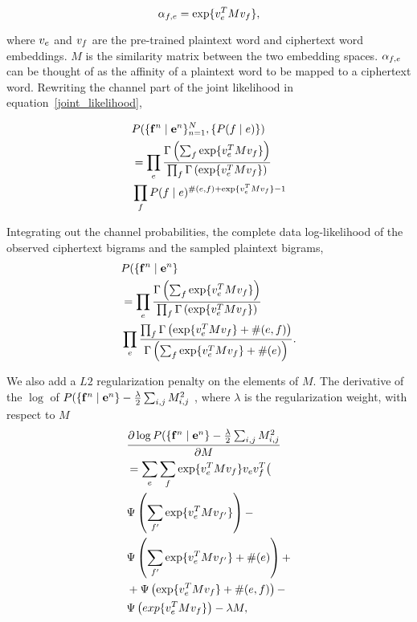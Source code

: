 \begin{equation}
\alpha_{f,e} = \exp \{ v_{e}^T  M  v_{f} \},
\end{equation}

where $v_{e}$ and $v_{f}$ are the pre-trained plaintext word and ciphertext word embeddings.  $M$ is the similarity matrix between the two embedding spaces. $\alpha_{f,e}$ can be thought of as the affinity of a plaintext word to be mapped to a ciphertext word. Rewriting the channel part of the joint likelihood in equation~\ref{joint_likelihood}, 

\begin{align*}
&P( \{ \mathbf{f}^n \mid \mathbf{e}^n \}_{n=1}^{N}, \{ P(f \mid e) \})  \\
&=\prod_{e}  \frac{\Gamma \left( \sum_{f} \exp \{ v_{e}^T  M  v_{f} \}  \right)} {\prod_{f} \Gamma \left( \exp \{ v_{e}^T  M  v_{f} \} \right)} \\
& \prod_{f} P(f \mid e)^{\#(e,f)+ \exp \{ v_{e}^T  M  v_{f} \} -1} 
\end{align*}

Integrating out the channel probabilities, the complete data log-likelihood of the observed ciphertext bigrams and the sampled plaintext bigrams,
\begin{align*}
&P( \{ \mathbf{f}^n \mid \mathbf{e}^n \} \\
&= \prod_{e}  \frac{\Gamma \left( \sum_{f} \exp \{ v_{e}^T  M  v_{f} \}  \right)} {\prod_{f} \Gamma \left( \exp \{ v_{e}^T  M  v_{f} \} \right)} \\
& \prod_{e}  \frac{\prod_{f} \Gamma \left( \exp \{ v_{e}^T  M  v_{f} \} + \#(e,f) \right)} {\Gamma \left( \sum_{f} \exp \{ v_{e}^T  M  v_{f} \} + \#(e) \right)}.
\end{align*}

We also add a $L2$ regularization penalty on the elements of $M$. The derivative of the $\log$ of $P( \{ \mathbf{f}^n \mid \mathbf{e}^n \} - \frac{\lambda}{2} \sum_{i,j} M_{i,j}^2$ , where $\lambda$ is the regularization weight, with respect to $M$
\begin{align*}
&\frac {\partial \log P( \{ \mathbf{f}^n \mid \mathbf{e}^n \} - \frac{\lambda}{2} \sum_{i,j} M_{i,j}^2 }{\partial M}  \\
& = \sum_{e}  \sum_{f} \exp \{ v_{e}^T  M  v_{f}\}  v_{e} v_{f}^T \bigl( \\
& \Psi \left( \sum_{f'} \exp \{ v_{e}^ T M  v_{f'} \} \right) - \\
& \Psi \left( \sum_{f'} \exp \{ v_{e}^T  M  v_{f'} \} + \#(e) \right)  + \\
& + \Psi \left( \exp \{ v_{e}^T  M  v_{f} \} + \#(e,f) \right) - \\
& \Psi \left( exp \{ v_{e}^T  M  v_{f} \} \right) - \lambda  M, 
\end{align*}

